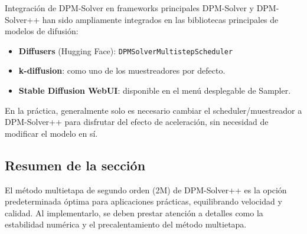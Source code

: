 \begin{knowledgebox}{Integración de DPM-Solver en frameworks principales}
DPM-Solver y DPM-Solver++ han sido ampliamente integrados en las bibliotecas principales de modelos de difusión:
\begin{itemize}
    \item \textbf{Diffusers} (Hugging Face): \texttt{DPMSolverMultistepScheduler}
    \item \textbf{k-diffusion}: como uno de los muestreadores por defecto.
    \item \textbf{Stable Diffusion WebUI}: disponible en el menú desplegable de Sampler.
\end{itemize}
En la práctica, generalmente solo es necesario cambiar el scheduler/muestreador a DPM-Solver++ para disfrutar del efecto de aceleración, sin necesidad de modificar el modelo en sí.
\end{knowledgebox}

\subsection{Resumen de la sección}

El método multietapa de segundo orden (2M) de DPM-Solver++ es la opción predeterminada óptima para aplicaciones prácticas, equilibrando velocidad y calidad. Al implementarlo, se deben prestar atención a detalles como la estabilidad numérica y el precalentamiento del método multietapa.


